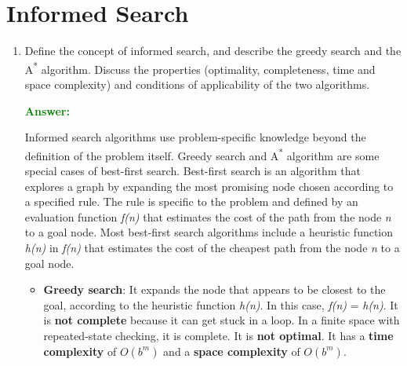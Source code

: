 \documentclass[12pt]{article}
\begin{document}
\section{Informed Search}\label{sec-informedsearch}
\begin{enumerate}[label=\textbf{IS.\arabic*}]
    \item Define the concept of informed search, and describe the greedy search and the A\textsuperscript{*} algorithm.
          Discuss the properties (optimality, completeness, time and space complexity) and conditions of applicability of the two algorithms.

          \textcolor{green}{\textbf{Answer:}}

          Informed search algorithms use problem-specific knowledge beyond the definition of the problem itself.
          Greedy search and A\textsuperscript{*} algorithm are some special cases of best-first search.
          Best-first search is an algorithm that explores a graph by expanding the most promising node chosen according to a specified rule.
          The rule is specific to the problem and defined by an evaluation function \textit{f(n)} that estimates the cost of the path from the node \textit{n} to a goal node. Most best-first search algorithms include a heuristic function \textit{h(n)} in \textit{f(n)} that estimates the cost of the cheapest path from the node \textit{n} to a goal node.

          \begin{itemize}
              \item \textbf{Greedy search}: It expands the node that appears to be closest to the goal, according to the heuristic function \textit{h(n)}. In this case, \textit{f(n)} = \textit{h(n)}. It is \textbf{not complete} because it can get stuck in a loop. In a finite space with repeated-state checking, it is complete. It is \textbf{not optimal}. It has a \textbf{time complexity} of $O(b^m)$ and a \textbf{space complexity} of $O(b^m)$.


\end{itemize}
\end{enumerate}
\end{document}
